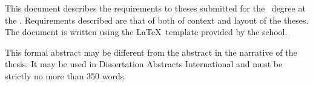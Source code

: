 



\begin{ThesisAbstract}
This document describes the requirements to theses submitted for the
\ThesisDegreeName\ degree at the \ThesisSchoolName.  Requirements
described are that of both of context and layout of the theses.  The
document is written using the \LaTeX\ template provided by the school.

This formal abstract may be different from the abstract in the
narrative of the thesis.  It may be used in Dissertation Abstracts
International and must be strictly no more than 350 words.
\end{ThesisAbstract}
